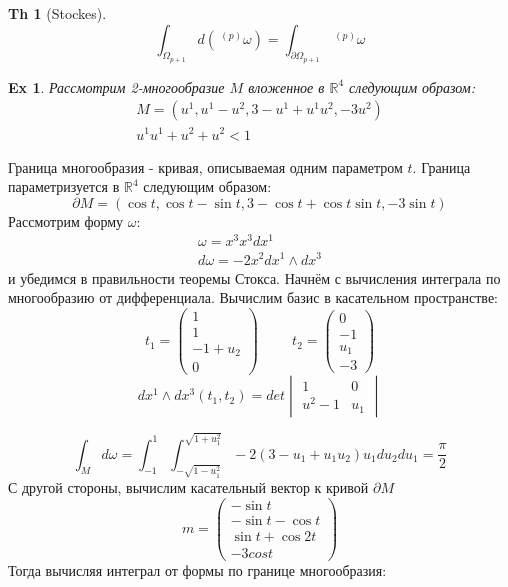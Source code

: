 \documentclass{article}
\newtheorem{example}{Ex}
\newtheorem{theorem}{Th}
\begin{document}
 	\begin{theorem}[Stockes]
 		\begin{equation}
 		\int_{\Omega_{p+1}} d(\ ^{(p)} \omega) = \int_{\partial\Omega_{p+1}} \ ^{(p)}\omega
 		\end{equation}
 	\end{theorem}
 	\begin{example}
 		Рассмотрим 2-многообразие $M$ вложенное в $\mathbb{R}^4$ следующим образом:	
 		\begin{gather}
 		M = (u^1, u^1 - u^2, 3 - u^1+u^1u^2, -3u^2)\\
 		u^1u^1+u^2+u^2<1
 		\end{gather}
 	\end{example}
 	Граница многообразия - кривая, описываемая одним параметром $t$. Граница параметризуется в $\mathbb{R}^4$ следующим образом:
 	\begin{equation}
 	\partial M = (\cos t, \cos t - \sin t, 3 - \cos t+ \cos t \sin t, -3 \sin t)
 	\end{equation}
 	Рассмотрим форму $\omega$:
 	\begin{gather}
 	\omega = x^3 x^3 dx^1 \\
 	d \omega = -2x^2 dx^1 \wedge d x^3
 	\end{gather}
 	и убедимся в правильности теоремы Стокса. Начнём с вычисления интеграла по многообразию от дифференциала. Вычислим базис в касательном пространстве:
 	\begin{equation}
 	t_1=\begin{pmatrix} 1 \\ 1 \\ -1 + u_2 \\ 0\end{pmatrix} \hspace{1cm} t_2 = \begin{pmatrix}
 	0\\ -1 \\ u_1 \\-3
 	\end{pmatrix}
 	\end{equation}
 	\begin{equation}
 	dx^1 \wedge dx^3 (t_1, t_2) = det \begin{vmatrix} 1 & 0 \\ u^2-1 & u_1\end{vmatrix}
 	\end{equation}
 	
 	\begin{equation}
 	\int_M d \omega = \int_{-1}^{1} \int_{-\sqrt{1-u_1^2}}^{\sqrt{1+u_1^2}} -2(3-u_1+u_1u_2)u_1 du_2 du_1 = \frac{\pi}{2}
 	\end{equation}
 	С другой стороны, вычислим касательный вектор к кривой $\partial M$
 	\begin{equation}
 	m = \begin{pmatrix} -\sin t \\ -\sin t - \cos t \\ \sin t + \cos 2t \\ -3 cos t\end{pmatrix}
 	\end{equation}
 	Тогда вычисляя интеграл от формы по границе многообразия:
 	
\end{document}
